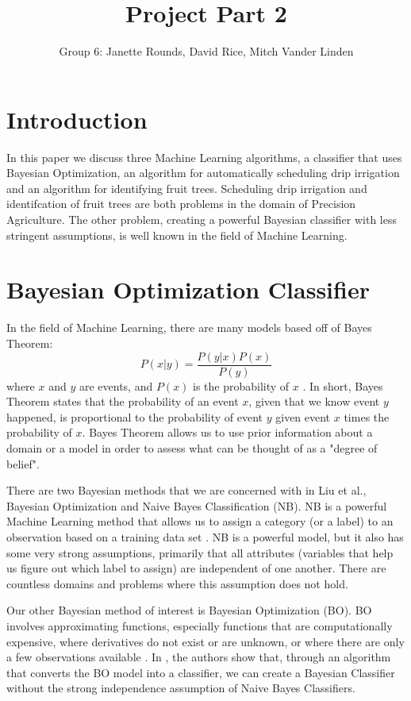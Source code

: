 \documentclass[]{article}
\title{Project Part 2}
\author{Group 6: Janette Rounds, David Rice, Mitch Vander Linden}
\begin{document}
\maketitle

\section{Introduction}
In this paper we discuss three Machine Learning algorithms, a classifier that uses Bayesian Optimization, an algorithm for automatically scheduling drip irrigation and an algorithm for identifying fruit trees. Scheduling drip irrigation and identifcation of fruit trees are both problems in the domain of Precision Agriculture. The other problem, creating a powerful Bayesian classifier with less stringent assumptions, is well known in the field of Machine Learning. 

\section{Bayesian Optimization Classifier}
In the field of Machine Learning, there are many models based off of Bayes Theorem: 
$$P(x|y) = \frac{P(y|x)P(x)}{P(y)}$$ where $x$ and $y$ are events, and $P(x)$ is the probability of $x$ \cite{koller2009probabilistic}.  In short, Bayes Theorem states that the probability of an event $x$, given that we know event $y$ happened, is proportional to the probability of event $y$ given event $x$ times the probability of $x$. Bayes Theorem allows us to use prior information about a domain or a model in order to assess what can be thought of as a "degree of belief". 

There are two Bayesian methods that we are concerned with in Liu et al.\cite[Liu 2013]{liu2013bayesian}, Bayesian Optimization and Naive Bayes Classification (NB).  NB is a powerful Machine Learning method that allows us to assign a category (or a label) to an observation based on a training data set \cite{koller2009probabilistic}. NB is a powerful model, but it also has some very strong assumptions, primarily that all attributes (variables that help us figure out which label to assign) are independent of one another. There are countless domains and problems where this assumption does not hold. 

Our other Bayesian method of interest is Bayesian Optimization (BO). BO involves approximating functions, especially functions that are computationally expensive, where derivatives do not exist or are unknown, or where there are only a few observations available \cite{brochu2010tutorial}. In \cite[Liu 2013]{liu2013bayesian}, the authors show that, through an algorithm that converts the BO model into a classifier, we can create a Bayesian Classifier without the strong independence assumption of Naive Bayes Classifiers. 
\end{document}
